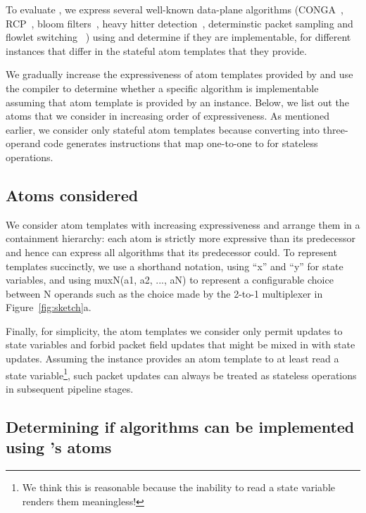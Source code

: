 To evaluate \pktlanguage, we express several well-known data-plane algorithms
(CONGA~\cite{conga}, RCP~\cite{rcp}, bloom filters~\cite{bloom}, heavy hitter
detection~\cite{opensketch}, determinstic packet sampling and flowlet switching
~\cite{flowlets}) using \pktlanguage and determine if they are implementable,
for different \absmachine instances that differ in the stateful atom templates
that they provide.

We gradually increase the expressiveness of atom templates provided by
\pktlanguage and use the \pktlanguage compiler to determine whether a specific
algorithm is implementable assuming that atom template is provided by an
\absmachine instance. Below, we list out the atoms that we consider in
increasing order of expressiveness. As mentioned earlier, we consider only
stateful atom templates because converting into three-operand code generates
instructions that map one-to-one to \absmachine for stateless operations.

\subsection{Atoms considered}

We consider atom templates with increasing expressiveness and arrange them in a
containment hierarchy: each atom is strictly more expressive than its
predecessor and hence can express all algorithms that its predecessor could. To
represent templates succinctly, we use a shorthand notation, using ``x'' and
``y'' for state variables, and using muxN(a1, a2, ..., aN) to represent a
configurable choice between N operands such as the choice made by the 2-to-1
multiplexer in Figure~\ref{fig:sketch}a.

Finally, for simplicity, the atom templates we consider only permit updates to
state variables and forbid packet field updates that might be mixed in with
state updates. Assuming the \absmachine instance provides an atom template to
at least read a state variable\footnote{We think this is reasonable because the
inability to read a state variable renders them meaningless!}, such packet
updates can always be treated as stateless operations in subsequent pipeline
stages.

\subsection{Determining if algorithms can be implemented using \absmachine's atoms}


